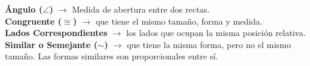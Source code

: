 \begin{defcard}
    \textbf{Ángulo ($\angle$)} $\rightarrow$ Medida de abertura entre dos rectas.\\
    \textbf{Congruente ($\cong$)} $\rightarrow$ que tiene el mismo tamaño, forma y medida.\\
    \textbf{Lados Correspondientes} $\rightarrow$ los lados que ocupan la misma posición relativa.\\
    \textbf{Similar o Semejante ($\sim$)} $\rightarrow$ que tiene la misma forma, pero no el mismo tamaño. Las formas similares son proporcionales entre sí.
\end{defcard}